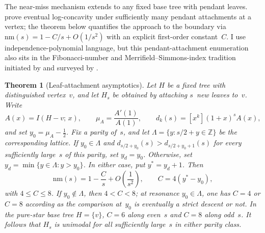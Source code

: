 \documentclass[12pt,oneside]{article}
\newtheorem{theorem}{Theorem}[section]
\theoremstyle{remark}
\newcommand{\nm}{\mathrm{nm}}             %
\begin{document}
The near-miss mechanism extends to any fixed base tree with pendant leaves.
\textcite[Theorem~1.11]{galvinhilyard2018} prove eventual log-concavity under sufficiently many pendant attachments at a vertex; the theorem below quantifies the approach to the boundary via $\nm(s)=1-C/s+O(1/s^2)$ with an explicit first-order constant~$C$.
I use independence-polynomial language, but this pendant-attachment enumeration also sits in the Fibonacci-number and Merrifield--Simmons-index tradition initiated by \textcite{prodinger_tichy1982} and surveyed by \textcite{gutman_wagner2010}.

\begin{theorem}[Leaf-attachment asymptotics]\label{thm:leaf-attach}
Let $H$ be a fixed tree with distinguished vertex~$v$, and let $H_s$ be obtained by attaching $s$~new leaves to~$v$.
Write
\[
  A(x)=I(H-v;\,x),\qquad
  \mu_A=\frac{A'(1)}{A(1)},\qquad
  d_k(s)=[x^k](1+x)^sA(x),
\]
and set $y_0=\mu_A-\tfrac12$.
Fix a parity of~$s$, and let $\Lambda=\{y:s/2+y\in\mathbb Z\}$ be the corresponding lattice.
If $y_0\in\Lambda$ and $d_{s/2+y_0}(s)>d_{s/2+y_0+1}(s)$ for every sufficiently large~$s$ of this parity, set $y_d=y_0$.
Otherwise, set $y_d=\min\{y\in\Lambda:y>y_0\}$.
In either case, put $y^*=y_d+1$.
Then
\[
  \nm(s)=1-\frac{C}{s}+O\!\left(\frac1{s^2}\right),
  \qquad C=4(y^*-y_0),
\]
with $4\le C\le8$.
If $y_0\notin\Lambda$, then $4<C<8$; at resonance $y_0\in\Lambda$, one has $C=4$ or $C=8$ according as the comparison at~$y_0$ is eventually a strict descent or not.
In the pure-star base tree $H=\{v\}$, $C=6$ along even~$s$ and $C=8$ along odd~$s$.
It follows that $H_s$ is unimodal for all sufficiently large~$s$ in either parity class.
\end{theorem}
\end{document}
